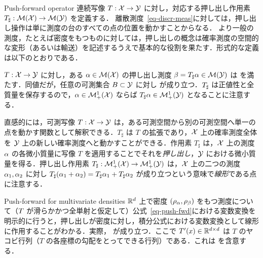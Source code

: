 \begin{rem2}{Push-forward operator}\label{rem-push-f}
連続写像 $T : \mathcal{X} \rightarrow \mathcal{Y}$ に対し，対応する押し出し作用素 $T_\sharp : \mathcal{M}(\mathcal{X}) \rightarrow \mathcal{M}(\mathcal{Y})$ を定義する．
%
離散測度~\eqref{eq-discr-meas}に対しては，押し出し操作は単に測度の台のすべての点の位置を動かすことからなる．
より一般の測度，たとえば密度をもつものに対しては，押し出しの概念は確率測度の空間的な変形（あるいは輸送）を記述するうえで基本的な役割を果たす．形式的な定義は以下のとおりである．

\begin{defn}[押し出し]\label{defn-pushfwd}
$T : \mathcal{X} \rightarrow \mathcal{Y}$ に対し，ある $\alpha \in \mathcal{M}(\mathcal{X})$ の押し出し測度 $\beta = T_\sharp \alpha \in \mathcal{M}(\mathcal{Y})$ は
を満たす．同値だが，任意の可測集合 $B \subset \mathcal{Y}$ に対し
が成り立つ．$T_\sharp$ は正値性と全質量を保存するので，$\alpha \in \mathcal{M}_+^1(\mathcal{X})$ ならば $T_\sharp \alpha \in \mathcal{M}_+^1(\mathcal{Y})$ となることに注意する．
\end{defn}

直感的には，可測写像 $T: \mathcal{X}\rightarrow \mathcal{Y}$ は，ある可測空間から別の可測空間へ単一の点を動かす関数として解釈できる．$T_\sharp$ は $T$ の拡張であり，$\mathcal{X}$ 上の確率測度全体を $\mathcal{Y}$ 上の新しい確率測度へと動かすことができる．作用素 $T_\sharp$ は，$\mathcal{X}$ 上の測度 $\alpha$ の各微小質量に写像 $T$ を適用することでそれを\emph{押し出し}，$\mathcal{Y}$ における微小質量を得る．押し出し作用素 $T_\sharp : \mathcal{M}_+^1(\mathcal{X}) \rightarrow \mathcal{M}_+^1(\mathcal{Y})$ は，$\mathcal{X}$ 上の二つの測度 $\alpha_1,\alpha_2$ に対し $T_\sharp(\alpha_1+\alpha_2)=T_\sharp\alpha_1+ T_\sharp\alpha_2$ が成り立つという意味で\emph{線形}である点に注意する．
\end{rem2}

\begin{rem2}{Push-forward for multivariate densities}
$\mathbb{R}^d$ 上で密度 $(\rho_{\alpha},\rho_{\beta})$ をもつ測度について（$T$ が滑らかかつ全単射と仮定して）公式~\eqref{eq-push-fwd}における変数変換を明示的に行うと，押し出しが密度に対し，積分公式における変数変換として線形に作用することがわかる．実際，
が成り立つ．ここで $T'(x) \in \mathbb{R}^{d \times d}$ は $T$ のヤコビ行列（$T$ の各座標の勾配をとってできる行列）である．これは
を含意する．
\end{rem2}


